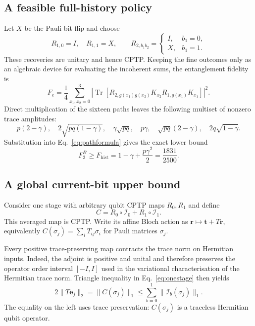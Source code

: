 \documentclass[11pt]{article}
\newcommand{\cI}{\mathcal I}
\newcommand{\Tr}{\operatorname{Tr}}
\begin{document}
\subsection{A feasible full-history policy}

Let $X$ be the Pauli bit flip and choose
\begin{equation}
 R_{1,0}=I,\quad R_{1,1}=X,\qquad
 R_{2,b_1b_2}=\begin{cases}I,&b_1=0,\\X,&b_1=1.\end{cases}
 \label{eq:historypolicy}
\end{equation}
These recoveries are unitary and hence CPTP.  Keeping the fine outcomes only as an
algebraic device for evaluating the incoherent sums, the entanglement fidelity is
\begin{equation}
 F_e=\frac14\sum_{x_1,x_2=0}^{3}
 \left|\Tr\!\left[R_{2,g(x_1)g(x_2)}K_{x_2}
 R_{1,g(x_1)}K_{x_1}\right]\right|^2.
 \label{eq:pathformula}
\end{equation}
Direct multiplication of the sixteen paths leaves the following multiset of nonzero
trace amplitudes:
\begin{equation}
 p(2-\gamma),\quad 2\sqrt{pq(1-\gamma)},\quad
 \gamma\sqrt{pq},\quad p\gamma,\quad
 \sqrt{pq}(2-\gamma),\quad 2q\sqrt{1-\gamma}.
 \label{eq:amplitudes}
\end{equation}
Substitution into Eq.~\eqref{eq:pathformula} gives the exact lower bound
\begin{equation}
 F_2^B\ge F_{\mathrm{hist}}
 =1-\gamma+\frac{p\gamma^2}{2}
 =\frac{1831}{2500}.
 \label{eq:historyvalue}
\end{equation}

\subsection{A global current-bit upper bound}

Consider one stage with arbitrary qubit CPTP maps $R_0,R_1$ and define
\begin{equation}
 C=R_0\circ\cI_0+R_1\circ\cI_1.
 \label{eq:onestage}
\end{equation}
This averaged map is CPTP.  Write its affine Bloch action as
$\bm r\mapsto\bm t+T\bm r$, equivalently
$C(\sigma_j)=\sum_iT_{ij}\sigma_i$ for Pauli matrices $\sigma_j$.

Every positive trace-preserving map contracts the trace norm on Hermitian inputs.
Indeed, the adjoint is positive and unital and therefore preserves the operator order
interval $[-I,I]$ used in the variational characterisation of the Hermitian trace norm.
Triangle inequality in Eq.~\eqref{eq:onestage} then yields
\begin{equation}
 2\|T\bm e_j\|_2=\|C(\sigma_j)\|_1
 \le \sum_{b=0}^{1}\|\cI_b(\sigma_j)\|_1.
 \label{eq:contraction}
\end{equation}
The equality on the left uses trace preservation: $C(\sigma_j)$ is a traceless
Hermitian qubit operator.
\end{document}
